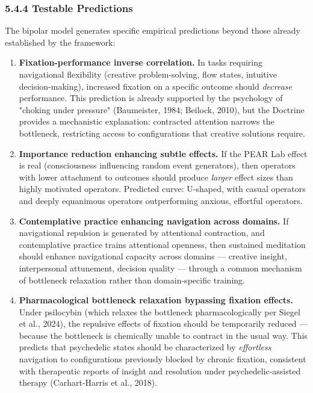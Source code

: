\subsubsection*{5.4.4 Testable Predictions}


The bipolar model generates specific empirical predictions beyond those already established by the framework:


\begin{enumerate}[nosep,leftmargin=*]
  \item \textbf{Fixation-performance inverse correlation.} In tasks requiring navigational flexibility (creative problem-solving, flow states, intuitive decision-making), increased fixation on a specific outcome should \textit{decrease} performance. This prediction is already supported by the psychology of "choking under pressure" (Baumeister, 1984; Beilock, 2010), but the Doctrine provides a mechanistic explanation: contracted attention narrows the bottleneck, restricting access to configurations that creative solutions require.
  \item \textbf{Importance reduction enhancing subtle effects.} If the PEAR Lab effect is real (consciousness influencing random event generators), then operators with lower attachment to outcomes should produce \textit{larger} effect sizes than highly motivated operators. Predicted curve: U-shaped, with casual operators and deeply equanimous operators outperforming anxious, effortful operators.
  \item \textbf{Contemplative practice enhancing navigation across domains.} If navigational repulsion is generated by attentional contraction, and contemplative practice trains attentional openness, then sustained meditation should enhance navigational capacity across domains — creative insight, interpersonal attunement, decision quality — through a common mechanism of bottleneck relaxation rather than domain-specific training.
  \item \textbf{Pharmacological bottleneck relaxation bypassing fixation effects.} Under psilocybin (which relaxes the bottleneck pharmacologically per Siegel et al., 2024), the repulsive effects of fixation should be temporarily reduced — because the bottleneck is chemically unable to contract in the usual way. This predicts that psychedelic states should be characterized by \textit{effortless} navigation to configurations previously blocked by chronic fixation, consistent with therapeutic reports of insight and resolution under psychedelic-assisted therapy (Carhart-Harris et al., 2018).
\end{enumerate}


